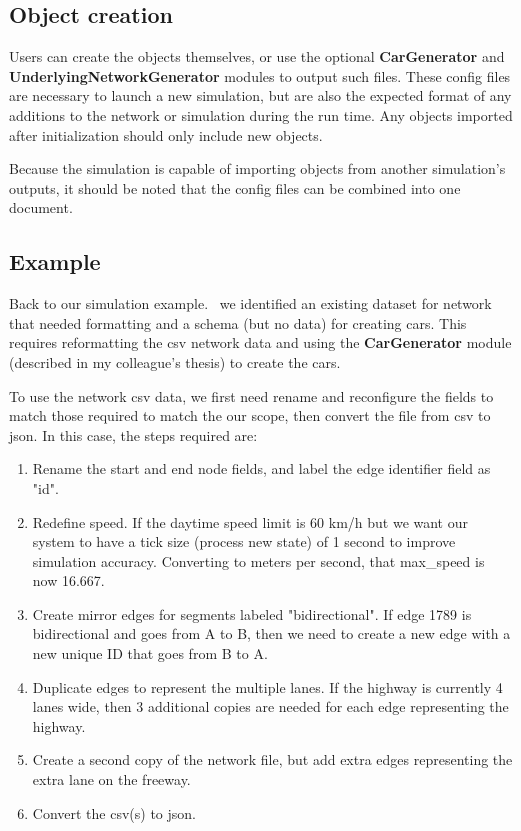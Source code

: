 \subsection{Object creation}

\par Users can create the objects themselves, or use the optional \textbf{CarGenerator} and \textbf{UnderlyingNetworkGenerator} modules to output such files. These config files are necessary to launch a new simulation, but are also the expected format of any additions to the network or simulation during the run time.  Any objects imported after initialization should only include new objects.\\

\par Because the simulation is capable of importing objects from another simulation's outputs, it should be noted that the config files can be combined into one document.  


\subsection{Example}
 \par  Back to our simulation example. \ we identified an existing dataset for network that needed formatting and a schema (but no data) for creating cars.  This requires reformatting the csv network data and using the \textbf{CarGenerator} module (described in my colleague's thesis) to create the cars. \\
 
\par To use the network csv data, we first need rename and reconfigure the fields to match those required to match the our scope, then convert the file from csv to json.  In this case, the steps required are:

\begin{enumerate}
    \item Rename the start and end node fields, and label the edge identifier field as "id". 
    \item Redefine speed.  If the daytime speed limit is 60 km/h but we want our system to have a tick size (process new state) of 1 second to improve simulation accuracy.  Converting to meters per second, that max\_speed is now 16.667.
    \item Create mirror edges for segments labeled "bidirectional".  If edge 1789 is bidirectional and goes from A to B, then we need to create a new edge with a new unique ID that goes from B to A.
    \item Duplicate edges to represent the multiple lanes.  If the highway is currently 4 lanes wide, then 3 additional copies are needed for each edge representing the highway.
    \item Create a second copy of the network file, but add extra edges representing the extra lane on the freeway.
    \item Convert the csv(s) to json.
\end{enumerate}

